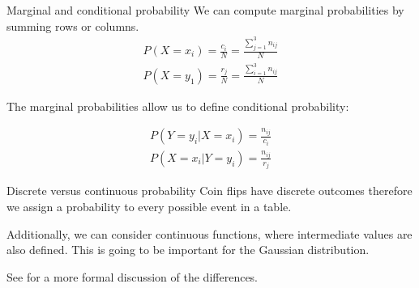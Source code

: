 \documentclass{beamer}
\begin{document}
  \begin{frame}{Marginal and conditional probability}
    We can compute marginal probabilities by summing rows or columns.
    \begin{align}
      P(X = x_i) = \frac{c_i}{N} = \frac{ \sum_{j=1}^{3} n_{ij}}{N} \\
      P(X = y_1) = \frac{r_j}{N} = \frac{ \sum_{i=1}^{3} n_{ij}}{N}
    \end{align}
    
    The marginal probabilities allow us to define conditional probability:
    
    \begin{align}
      P(Y = y_i | X = x_i) = \frac{n_{ij}}{c_i} \\
      P(X = x_i | Y = y_i) = \frac{n_{ij}}{r_j}
    \end{align}

    \end{frame}

    \begin{frame}{Discrete versus continuous probability}
      Coin flips have discrete outcomes therefore we assign a probability
      to every possible event in a table.

      Additionally, we can consider continuous functions, where intermediate values
      are also defined. This is going to be important for the Gaussian distribution.

      See \cite{deisenroth2020mathematics} for a more formal discussion of the differences.
    \end{frame}
\end{document}
